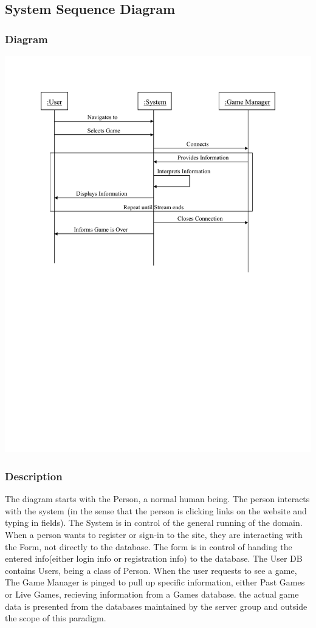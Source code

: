 %

	\subsection{System Sequence Diagram}
	
		\subsubsection{Diagram}
			\includegraphics[width=1.0\textwidth]{./SSD_of_Watch_Live.pdf}
			
		\subsubsection{Description}
			The diagram starts with the Person, a normal human being. The person interacts with the system (in the sense that the person is clicking links on the website and typing in fields). The System is in control of the general running of the domain. When a person wants to register or sign-in to the site, they are interacting with the Form, not directly to the database. The form is in control of handing the entered info(either login info or registration info) to the database. The User DB contains Users, being a class of Person. When the user requests to see a game, The Game Manager is pinged to pull up specific information, either Past Games or Live Games, recieving information from a Games database. the actual game data is presented from the databases maintained by the server group and outside the scope of this paradigm.
